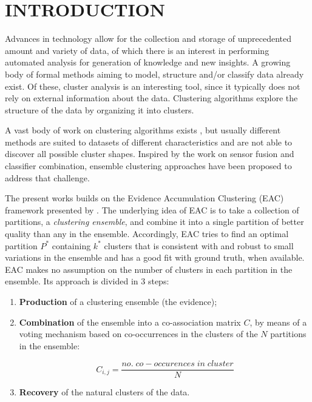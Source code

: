 \section{\uppercase{Introduction}}
\label{sec:intro}


Advances in technology allow for the collection and storage of unprecedented amount and variety of data, of which there is an interest in performing automated analysis for generation of knowledge and new insights.
A growing body of formal methods aiming to model, structure and/or classify data already exist. %
Of these, cluster analysis is an interesting tool, since it typically does not rely on external information about the data.
Clustering algorithms explore the structure of the data by organizing it into clusters.

A vast body of work on clustering algorithms exists \cite{Jain2010}, but usually different methods are suited to datasets of different characteristics and are not able to discover all possible cluster shapes.
Inspired by the work on sensor fusion and classifier combination, ensemble clustering approaches \cite{Fred2001,Fred2002,Strehl2002} have been proposed to address that challenge.

The present works builds on the Evidence Accumulation Clustering (EAC) framework presented by \cite{Fred2002,Fred2005}.
The underlying idea of EAC is to take a collection of partitions, a \emph{clustering ensemble}, and combine it into a single partition of better quality than any in the ensemble.
Accordingly, EAC tries to find an optimal partition $P^*$ containing $k^*$ clusters that is consistent with and robust to small variations in the ensemble and has a good fit with ground truth, when available.
EAC makes no assumption on the number of clusters in each partition in the ensemble.
Its approach is divided in 3 steps:

\begin{enumerate}
\item \textbf{Production} of a clustering ensemble (the evidence);
\item \textbf{Combination} of the ensemble into a co-association matrix $C$, by means of a voting mechanism based on co-occurrences in the clusters of the $N$ partitions in the ensemble:

\begin{center}
$$
C_{i,j} = \frac{no. \; co-occurences \; in \; cluster}{N}
$$
\end{center}

\item \textbf{Recovery} of the natural clusters of the data.
\end{enumerate}

